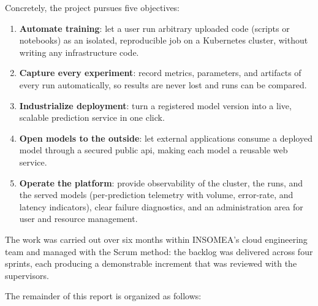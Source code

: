 Concretely, the project pursues five objectives:

\begin{enumerate}[leftmargin=1.8em]
  \item \textbf{Automate training}: let a user run arbitrary uploaded code
        (scripts or notebooks) as an isolated, reproducible job on a Kubernetes
        cluster, without writing any infrastructure code.
  \item \textbf{Capture every experiment}: record metrics, parameters, and
        artifacts of every run automatically, so results are never lost and runs
        can be compared.
  \item \textbf{Industrialize deployment}: turn a registered model version into a
        live, scalable prediction service in one click.
  \item \textbf{Open models to the outside}: let external applications consume a
        deployed model through a secured public \gls{api}, making each model a
        reusable web service.
  \item \textbf{Operate the platform}: provide observability of the cluster, the
        runs, and the served models (per-prediction telemetry with volume,
        error-rate, and latency indicators), clear failure diagnostics, and an
        administration area for user and resource management.
\end{enumerate}

The work was carried out over six months within INSOMEA's cloud engineering
team and managed with the Scrum method: the backlog was delivered across four
sprints, each producing a demonstrable increment that was reviewed with the
supervisors.

The remainder of this report is organized as follows:

